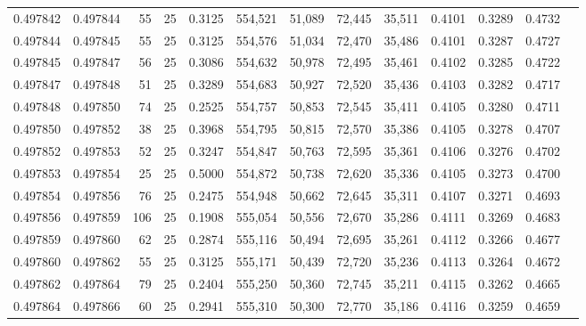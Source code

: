 \begin{tabular}{rrrrrrrrrrrrr}
0.497842 & 0.497844 &    55 &  25 &                                     0.3125 & 554,521 &  51,089 &  72,445 &  35,511 & 0.4101 & 0.3289 & 0.4732 \\
0.497844 & 0.497845 &    55 &  25 &                                     0.3125 & 554,576 &  51,034 &  72,470 &  35,486 & 0.4101 & 0.3287 & 0.4727 \\
0.497845 & 0.497847 &    56 &  25 &                                     0.3086 & 554,632 &  50,978 &  72,495 &  35,461 & 0.4102 & 0.3285 & 0.4722 \\
0.497847 & 0.497848 &    51 &  25 &                                     0.3289 & 554,683 &  50,927 &  72,520 &  35,436 & 0.4103 & 0.3282 & 0.4717 \\
0.497848 & 0.497850 &    74 &  25 &                                     0.2525 & 554,757 &  50,853 &  72,545 &  35,411 & 0.4105 & 0.3280 & 0.4711 \\
0.497850 & 0.497852 &    38 &  25 &                                     0.3968 & 554,795 &  50,815 &  72,570 &  35,386 & 0.4105 & 0.3278 & 0.4707 \\
0.497852 & 0.497853 &    52 &  25 &                                     0.3247 & 554,847 &  50,763 &  72,595 &  35,361 & 0.4106 & 0.3276 & 0.4702 \\
0.497853 & 0.497854 &    25 &  25 &                                     0.5000 & 554,872 &  50,738 &  72,620 &  35,336 & 0.4105 & 0.3273 & 0.4700 \\
0.497854 & 0.497856 &    76 &  25 &                                     0.2475 & 554,948 &  50,662 &  72,645 &  35,311 & 0.4107 & 0.3271 & 0.4693 \\
0.497856 & 0.497859 &   106 &  25 &                                     0.1908 & 555,054 &  50,556 &  72,670 &  35,286 & 0.4111 & 0.3269 & 0.4683 \\
0.497859 & 0.497860 &    62 &  25 &                                     0.2874 & 555,116 &  50,494 &  72,695 &  35,261 & 0.4112 & 0.3266 & 0.4677 \\
0.497860 & 0.497862 &    55 &  25 &                                     0.3125 & 555,171 &  50,439 &  72,720 &  35,236 & 0.4113 & 0.3264 & 0.4672 \\
0.497862 & 0.497864 &    79 &  25 &                                     0.2404 & 555,250 &  50,360 &  72,745 &  35,211 & 0.4115 & 0.3262 & 0.4665 \\
0.497864 & 0.497866 &    60 &  25 &                                     0.2941 & 555,310 &  50,300 &  72,770 &  35,186 & 0.4116 & 0.3259 & 0.4659 \\

\end{tabular}

